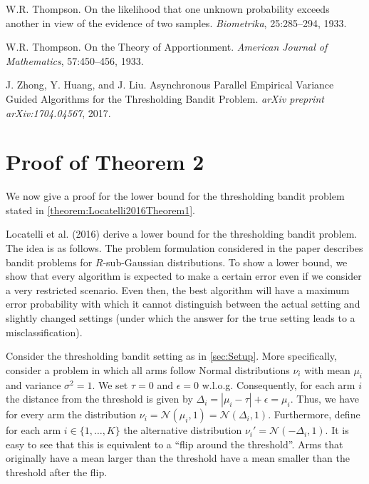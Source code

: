 \documentclass[11pt,]{article}
\begin{document}
W.R. Thompson. On the likelihood that one unknown probability exceeds
another in view of the evidence of two samples. \emph{Biometrika},
25:285--294, 1933.\par

W.R. Thompson. On the Theory of Apportionment. \emph{American Journal of
Mathematics}, 57:450--456, 1933.\par

J. Zhong, Y. Huang, and J. Liu. Asynchronous Parallel Empirical Variance
Guided Algorithms for the Thresholding Bandit Problem. \emph{arXiv
preprint arXiv:1704.04567}, 2017.\par

\newpage

\appendix

\section{Proof of Theorem 2} \label{app:AppendixAPTLB}

We now give a proof for the lower bound for the thresholding bandit
problem stated in \autoref{theorem:Locatelli2016Theorem1}.

Locatelli et al. (2016) derive a lower bound for the thresholding bandit
problem. The idea is as follows. The problem formulation considered in
the paper describes bandit problems for \(R\)-sub-Gaussian
distributions. To show a lower bound, we show that every algorithm is
expected to make a certain error even if we consider a very restricted
scenario. Even then, the best algorithm will have a maximum error
probability with which it cannot distinguish between the actual setting
and slightly changed settings (under which the answer for the true
setting leads to a misclassification).

Consider the thresholding bandit setting as in \autoref{sec:Setup}. More
specifically, consider a problem in which all arms follow Normal
distributions \(\nu_i\) with mean \(\mu_i\) and variance
\(\sigma^2 = 1\). We set \(\tau = 0\) and \(\epsilon = 0\) w.l.o.g.
Consequently, for each arm \(i\) the distance from the threshold is
given by \(\Delta_i = |\mu_i - \tau| + \epsilon = \mu_i\). Thus, we have
for every arm the distribution
\(\nu_i = \mathcal{N}(\mu_i,1) = \mathcal{N}(\Delta_i,1)\). Furthermore,
define for each arm \(i \in \{1, \dots, K\}\) the alternative
distribution \(\nu_i' = \mathcal{N}(-\Delta_i,1)\). It is easy to see
that this is equivalent to a ``flip around the threshold''. Arms that
originally have a mean larger than the threshold have a mean smaller
than the threshold after the flip.
\end{document}

